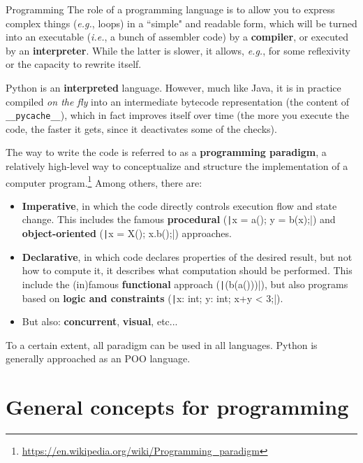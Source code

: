 \documentclass[10pt,
]{beamer}
\begin{document}
\begin{frame}{Programming}
	The role of a programming language is to allow you to express complex things (\textit{e.g.}, loops) in a ``simple" and readable form, which will be turned into an executable (\textit{i.e.}, a bunch of assembler code) by a \textbf{compiler}, or executed by an \textbf{interpreter}. While the latter is slower, it allows, \textit{e.g.}, for some reflexivity or the capacity to rewrite itself.
	
	Python is an \textbf{interpreted} language. However, much like Java, it is in practice compiled \textit{on the fly} into an intermediate bytecode representation (the content of \texttt{\_\_pycache\_\_}), which in fact improves itself over time (the more you execute the code, the faster it gets, since it deactivates some of the checks).
\end{frame}

\begin{frame}[fragile]
	The way to write the code is referred to as a \textbf{programming paradigm}, a relatively high-level way to conceptualize and structure the implementation of a computer program.\footnote{\url{https://en.wikipedia.org/wiki/Programming_paradigm}} Among others, there are:\begin{itemize}
		\item \textbf{Imperative}, in which the code directly controls execution flow and state change. This includes the famous \textbf{procedural} (\texttt|x = a(); y = b(x);|) and \textbf{object-oriented} (\texttt|x = X(); x.b();|) approaches.
		\item \textbf{Declarative}, in which code declares properties of the desired result, but not how to compute it, it describes what computation should be performed. This include the (in)famous \textbf{functional} approach (\texttt|(b(a()))|), but also programs based on \textbf{logic and constraints} (\texttt|x: int; y: int; x+y < 3;|).
		\item But also: \textbf{concurrent}, \textbf{visual}, etc...
	\end{itemize}
	
	To a certain extent, all paradigm can be used in all languages. Python is generally approached as an POO language.
	\vspace{1em}
\end{frame}

\section{General concepts for programming}
\end{document}
